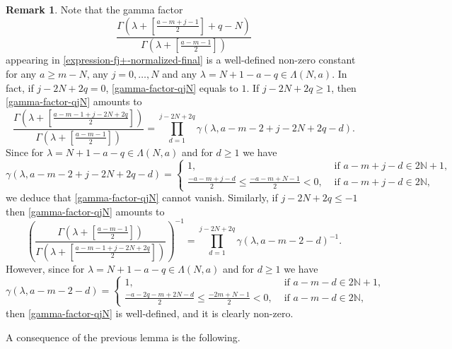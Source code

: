 \documentclass[12pt, pdflatex, a4paper]{article}
\theoremstyle{plain}
\theoremstyle{definition}
\newtheorem{rem}[thm]{Remark}
\def\N{{\mathbb N}}
\begin{document}
\begin{rem}\label{rem-gamma-factor-qjN} Note that the gamma factor
\begin{equation}\label{gamma-factor-qjN}
\frac{\Gamma\left(\lambda+\left[\frac{a-m+j-1}{2}\right] +q-N\right)}{\Gamma\left(\lambda+\left[\frac{a-m-1}{2}\right]\right)}
\end{equation}
appearing in \eqref{expression-fj+-normalized-final} is a well-defined non-zero constant for any $a \geq m-N$, any $j = 0, \ldots, N$ and any $\lambda = N+1-a-q \in \Lambda(N,a)$. In fact, if $j-2N+2q = 0$, \eqref{gamma-factor-qjN} equals to $1$. If $j-2N+2q \geq 1$, then \eqref{gamma-factor-qjN} amounts to
\begin{equation*}
\frac{\Gamma\left(\lambda+\left[\frac{a-m-1+j-2N+2q}{2}\right] \right)}{\Gamma\left(\lambda+\left[\frac{a-m-1}{2}\right]\right)} = 
\prod_{d=1}^{j-2N+2q}\gamma(\lambda, a-m-2+j-2N+2q-d).
\end{equation*}
Since for $\lambda = N+1-a-q \in \Lambda(N,a)$ and for $d\geq 1$ we have
\begin{equation*}
\gamma(\lambda, a-m-2+j-2N+2q-d) = \begin{cases}
1, & \text{ if } a-m+j-d \in 2\N+1,\\
\frac{-a-m+j-d}{2} \leq \frac{-a-m+N-1}{2} < 0, & \text{ if } a-m+j-d \in 2\N,
\end{cases}
\end{equation*}
we deduce that \eqref{gamma-factor-qjN} cannot vanish.
Similarly, if $j-2N+2q \leq -1$ then \eqref{gamma-factor-qjN} amounts to
\begin{equation*}
\left(\frac{\Gamma\left(\lambda+\left[\frac{a-m-1}{2}\right]\right)}{\Gamma\left(\lambda+\left[\frac{a-m-1+j-2N+2q}{2}\right] \right)}\right)^{-1} = 
\prod_{d=1}^{j-2N+2q}\gamma(\lambda, a-m-2-d)^{-1}.
\end{equation*}
However, since for $\lambda = N+1-a-q \in \Lambda(N,a)$ and for $d\geq 1$ we have
\begin{equation*}
\gamma(\lambda, a-m-2-d) = \begin{cases}
1, &\text{ if } a-m-d \in 2\N+1,\\
\frac{-a-2q-m+2N-d}{2} \leq \frac{-2m+N-1}{2} <0, &\text{ if } a-m-d \in 2\N,
\end{cases}
\end{equation*}
then \eqref{gamma-factor-qjN} is well-defined, and it is clearly non-zero.
\end{rem}

A consequence of the previous lemma is the following.
\end{document}
